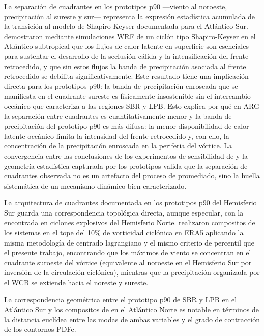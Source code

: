 
La separación de cuadrantes en los prototipos p90 —viento al noroeste, precipitación al sureste y sur— representa la expresión estadística acumulada de la transición al modelo de Shapiro-Keyser documentada para el Atlántico Sur. \citet{gozzo2013air} demostraron mediante simulaciones WRF de un ciclón tipo Shapiro-Keyser en el Atlántico subtropical que los flujos de calor latente en superficie son esenciales para sustentar el desarrollo de la seclusión cálida y la intensificación del frente retrocedido, y que sin estos flujos la banda de precipitación asociada al frente retrocedido se debilita significativamente. Este resultado tiene una implicación directa para los prototipos p90: la banda de precipitación enroscada que se manifiesta en el cuadrante sureste es físicamente insostenible sin el intercambio oceánico que caracteriza a las regiones SBR y LPB. Esto explica por qué en ARG la separación entre cuadrantes es cuantitativamente menor y la banda de precipitación del prototipo p90 es más difusa: la menor disponibilidad de calor latente oceánico limita la intensidad del frente retrocedido y, con ello, la concentración de la precipitación enroscada en la periferia del vórtice. La convergencia entre las conclusiones de los experimentos de sensibilidad de \citet{gozzo2013air} y la geometría estadística capturada por los prototipos valida que la separación de cuadrantes observada no es un artefacto del proceso de promediado, sino la huella sistemática de un mecanismo dinámico bien caracterizado.


La arquitectura de cuadrantes documentada en los prototipos p90 del Hemisferio Sur guarda una correspondencia topológica directa, aunque especular, con la encontrada en ciclones explosivos del Hemisferio Norte. \citet{priestley2022improved} realizaron compositos de los sistemas en el tope del 10\% de vorticidad ciclónica en ERA5 aplicando la misma metodología de centrado lagrangiano y el mismo criterio de percentil que el presente trabajo, encontrando que los máximos de viento se concentran en el cuadrante suroeste del vórtice (equivalente al noroeste en el Hemisferio Sur por inversión de la circulación ciclónica), mientras que la precipitación organizada por el WCB se extiende hacia el noreste y sureste. 

La correspondencia geométrica entre el prototipo p90 de SBR y LPB en el Atlántico Sur y los compositos de \citet{priestley2022improved} en el Atlántico Norte es notable en términos de la distancia euclídea entre las modas de ambas variables y el grado de contracción de los contornos PDFe.

